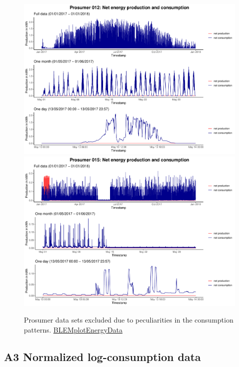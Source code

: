 \begin{centering}
\begin{figure}[H]
        \includegraphics[width=\textwidth-0.85cm]{thesis/graphs/timeseries/p012_prod&cons.pdf}\vspace{0.3cm}
        \includegraphics[width=\textwidth-0.85cm]{thesis/graphs/timeseries/p015_prod&cons.pdf}
        \caption[Prosumer data sets excluded due to peculiarities in the consumption patterns]{Prosumer data sets excluded due to peculiarities in the consumption patterns. \quantnet\href{ }{BLEMplotEnergyData}}
        \label{App:Fig:excludedpros}
\end{figure}
\end{centering}


\subsection*{A3 Normalized log-consumption data}\label{App:Figures:transform}

